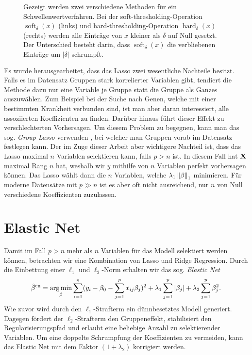 \begin{figure}
\begin{subfigure}{0.4\textwidth}
	\label{soft_thresholding}
	\end{subfigure}
\caption{Gezeigt werden zwei verschiedene Methoden für ein Schwellenwertverfahren. Bei der soft-thresholding-Operation $\operatorname{soft}_{\delta}(x)$ (links) und hard-thresholding-Operation $\operatorname{hard}_{\delta}(x)$ (rechts) werden alle Einträge von $x$ kleiner als $\delta$ auf Null gesetzt. Der Unterschied besteht darin, dass $\operatorname{soft}_{\delta}(x)$ die verbliebenen Einträge um $|\delta|$ schrumpft.}
\label{thresholding_figure}
\end{figure}

Es wurde herausgearbeitet, dass das Lasso zwei wesentliche Nachteile besitzt. Falls es im Datensatz Gruppen stark korrelierter Variablen gibt, tendiert die Methode dazu nur eine Variable je Gruppe statt die Gruppe als Ganzes auszuwählen. Zum Beispiel bei der Suche nach Genen, welche mit einer bestimmten Krankheit verbunden sind, ist man aber daran interessiert, alle assoziierten Koeffizienten zu finden. Darüber hinaus führt dieser Effekt zu verschlechterten Vorhersagen. Um diesem Problem zu begegnen, kann man das sog. \textit{Group Lasso} verwenden \cite{yuan}, bei welcher man Gruppen vorab im Datensatz festlegen kann. Der im Zuge dieser Arbeit aber wichtigere Nachteil ist, dass das Lasso maximal $n$ Variablen selektieren kann, falls $p > n$ ist. In diesem Fall hat $\mathbf{X}$ maximal Rang $n$ hat, weshalb wir $y$ mithilfe von $n$ Variablen perfekt vorhersagen können. Das Lasso wählt dann die $n$ Variablen, welche $\lambda_1\left\lVert \beta \right\rVert_1$ minimieren. Für moderne Datensätze mit $p \gg n$ ist es aber oft nicht ausreichend, nur $n$ von Null verschiedene Koeffizienten zuzulassen.




\section{Elastic Net}
\label{elastic_net}

Damit im Fall $p > n$ mehr als $n$ Variablen für das Modell selektiert werden können, betrachten wir eine Kombination von Lasso und Ridge Regression. Durch die Einbettung einer $\ell_1$ und $\ell_2$-Norm erhalten wir das sog. \textit{Elastic Net} \cite{zou_elasticnet}
\begin{align}
\label{elastic_net_formulation}
\hat{\beta}^{\text{en}} = \operatorname*{arg\,min}_{\beta} \sum_{i=1}^{n}(y_i - \beta_0 - \sum_{j=1}^p x_{ij}\beta_j)^2 + \lambda_1\sum_{j=1}^p \left|\beta_j\right| + \lambda_2\sum_{j=1}^p \beta_j^2.
\end{align}
Wie zuvor wird durch den $\ell_1$-Strafterm ein dünnbesetztes Modell generiert. Dagegen fördert der $\ell_2$-Strafterm den Gruppeneffekt, stabilisiert den Regularisierungspfad und erlaubt eine beliebige Anzahl zu selektierender Variablen. Um eine doppelte Schrumpfung der Koeffizienten zu vermeiden, kann das Elastic Net mit dem Faktor $(1 + \lambda_2)$ korrigiert werden. 


